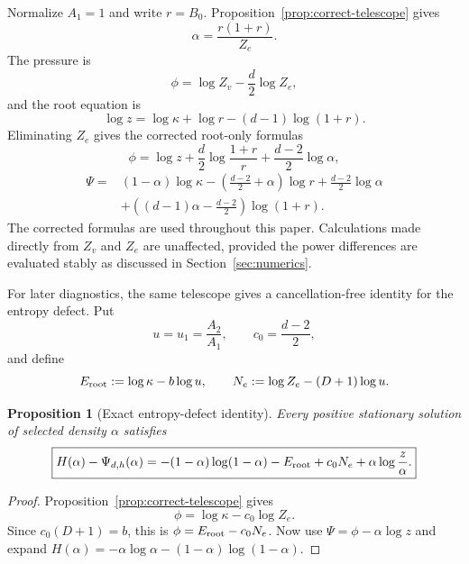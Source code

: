 \documentclass[11pt]{amsart}
\newtheorem{proposition}[theorem]{Proposition}
\theoremstyle{definition}
\begin{document}
Normalize $A_1=1$ and write $r=B_0$.  Proposition~\ref{prop:correct-telescope} gives
\begin{equation}\label{eq:alpha-root-correct}
 \alpha=\frac{r(1+r)}{Z_e}.
\end{equation}
The pressure is
\[
 \phi=\log Z_v-\frac d2\log Z_e,
\]
and the root equation is
\[
 \log z=\log\kappa+\log r-(d-1)\log(1+r).
\]
Eliminating $Z_e$ gives the corrected root-only formulas
\begin{equation}\label{eq:root-pressure-correct}
 \boxed{
 \phi
 =\log z
 +\frac d2\log\frac{1+r}{r}
 +\frac{d-2}{2}\log\alpha,
 }
\end{equation}
\begin{equation}\label{eq:root-micro-correct}
\boxed{
\begin{aligned}
 \Psi={}&
 (1-\alpha)\log\kappa
 -\left(\frac{d-2}{2}+\alpha\right)\log r
 +\frac{d-2}{2}\log\alpha\\
 &+\left((d-1)\alpha-\frac{d-2}{2}\right)\log(1+r).
\end{aligned}
}
\end{equation}
The corrected formulas are used throughout this paper.  Calculations made directly from $Z_v$ and $Z_e$ are unaffected, provided the power differences are evaluated stably as discussed in Section~\ref{sec:numerics}.

For later diagnostics, the same telescope gives a cancellation-free identity for the entropy defect.  Put
\[
 u=u_1=\frac{A_2}{A_1},
 \qquad c_0=\frac{d-2}{2},
\]
and define
\[
 E_{\rm root}:=\log\kappa-b\log u,
 \qquad
 N_e:=\log Z_e-(D+1)\log u.
\]

\begin{proposition}[Exact entropy-defect identity]\label{prop:defect-identity}
Every positive stationary solution of selected density $\alpha$ satisfies
\begin{equation}\label{eq:defect-identity}
 \boxed{
 H(\alpha)-\Psi_{d,h}(\alpha)
 =-(1-\alpha)\log(1-\alpha)
 -E_{\rm root}+c_0N_e
 +\alpha\log\frac z\alpha.
 }
\end{equation}
\end{proposition}

\begin{proof}
Proposition~\ref{prop:correct-telescope} gives
\[
 \phi=\log\kappa-c_0\log Z_e.
\]
Since $c_0(D+1)=b$, this is
$\phi=E_{\rm root}-c_0N_e$.  Now use
$\Psi=\phi-\alpha\log z$ and expand
$H(\alpha)=-\alpha\log\alpha-(1-\alpha)\log(1-\alpha)$.
\end{proof}
\end{document}
